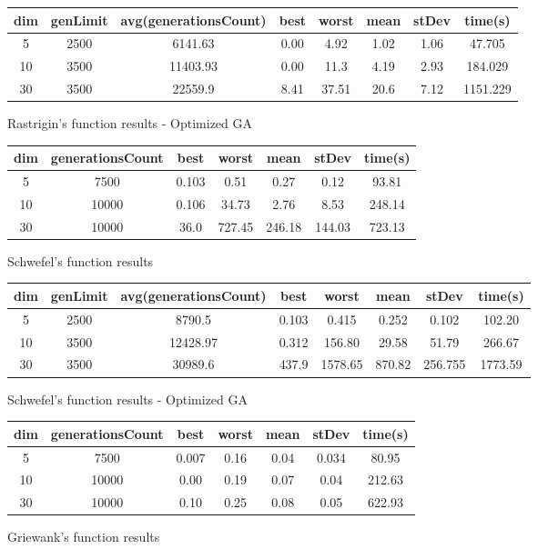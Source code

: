 \documentclass[a4paper]{article}
\begin{document}
	\begin{figure}[!h]
		\centering
		\begin{tabular}{|| c | c | c | c | c | c | c | c ||}
			\hline
			dim & genLimit & avg(generationsCount) & best & worst & mean & stDev & time(s) \\ \hline \hline
			5 & 2500 & 6141.63 & 0.00 & 4.92 & 1.02 & 1.06 & 47.705 \\ \hline
			10 & 3500 & 11403.93 & 0.00 & 11.3 & 4.19 & 2.93 & 184.029 \\ \hline
			30 & 3500 & 22559.9 & 8.41 & 37.51 & 20.6 & 7.12 & 1151.229 \\ \hline
		\end{tabular}
		\caption{Rastrigin's function results - Optimized GA}
	\end{figure}
	
	\begin{figure}[!h]
		\centering
		\begin{tabular}{|| c | c | c | c | c | c | c ||}
			\hline
			dim & generationsCount & best & worst & mean & stDev & time(s) \\ \hline \hline
			5 & 7500 & 0.103 & 0.51 & 0.27 & 0.12 & 93.81 \\ \hline
			10 & 10000 & 0.106 & 34.73 & 2.76 & 8.53 & 248.14 \\ \hline
			30 & 10000 & 36.0 & 727.45 & 246.18 & 144.03 & 723.13 \\ \hline
		\end{tabular}
		\caption{Schwefel's function results}
	\end{figure}
	
	\begin{figure}[!h]
		\centering
		\begin{tabular}{|| c | c | c | c | c | c | c | c ||}
			\hline
			dim & genLimit & avg(generationsCount) & best & worst & mean & stDev & time(s) \\ \hline \hline
			5 & 2500 & 8790.5 & 0.103 & 0.415 & 0.252 & 0.102 & 102.20 \\ \hline
			10 & 3500 & 12428.97 & 0.312 & 156.80 & 29.58 & 51.79 & 266.67 \\ \hline
			30 & 3500 & 30989.6 & 437.9 & 1578.65 & 870.82 & 256.755 & 1773.59 \\ \hline
		\end{tabular}
		\caption{Schwefel's function results - Optimized GA}
	\end{figure}
	
	\begin{figure}[!h]
		\centering
		\begin{tabular}{|| c | c | c | c | c | c | c ||}
			\hline
			dim & generationsCount & best & worst & mean & stDev & time(s) \\ \hline \hline
			5 & 7500 & 0.007 & 0.16 & 0.04 & 0.034 & 80.95 \\ \hline
			10 & 10000 & 0.00 & 0.19 & 0.07 & 0.04 & 212.63 \\ \hline
			30 & 10000 & 0.10 & 0.25 & 0.08 & 0.05 & 622.93 \\ \hline
		\end{tabular}
		\caption{Griewank's function results}
	\end{figure}
	
\end{document}
